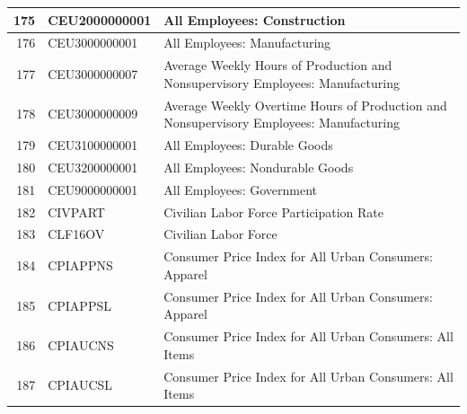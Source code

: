 \documentclass[11pt]{article}
\begin{document}
\begin{table}
\begin{tabular}{rp{5cm}p{11cm}}
  \hline
	175 & CEU2000000001 & All Employees: Construction \\
  \hline
	176 & CEU3000000001 & All Employees: Manufacturing \\
  \hline
	177 & CEU3000000007 & Average Weekly Hours of Production and Nonsupervisory Employees: Manufacturing \\
  \hline
	178 & CEU3000000009 & Average Weekly Overtime Hours of Production and Nonsupervisory Employees: Manufacturing \\
  \hline
	179 & CEU3100000001 & All Employees: Durable Goods \\
  \hline
	180 & CEU3200000001 & All Employees: Nondurable Goods \\
  \hline
	181 & CEU9000000001 & All Employees: Government \\
  \hline
	182 & CIVPART & Civilian Labor Force Participation Rate \\
  \hline
	183 & CLF16OV & Civilian Labor Force \\
  \hline
	184 & CPIAPPNS & Consumer Price Index for All Urban Consumers: Apparel \\
  \hline
	185 & CPIAPPSL & Consumer Price Index for All Urban Consumers: Apparel \\
  \hline
	186 & CPIAUCNS & Consumer Price Index for All Urban Consumers: All Items \\
  \hline
	187 & CPIAUCSL & Consumer Price Index for All Urban Consumers: All Items \\
\end{tabular}
\end{table}
\end{document}
